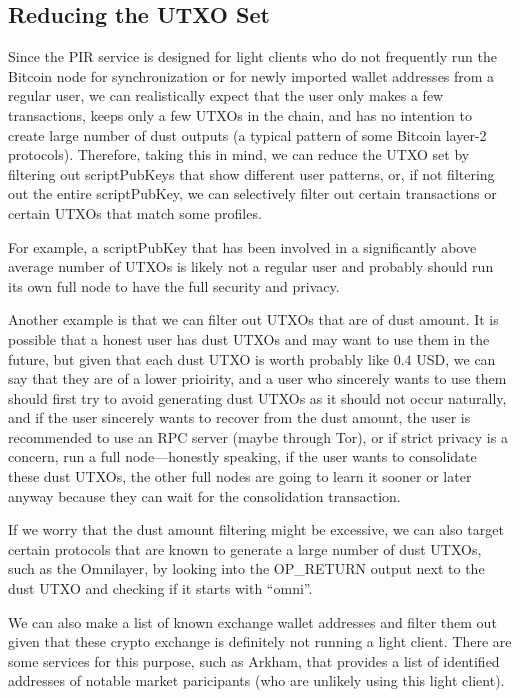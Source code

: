 \subsection{Reducing the UTXO Set}
\label{sec:extension}

Since the PIR service is designed for light clients who do not frequently run the Bitcoin node for synchronization or for newly imported wallet addresses from a regular user, we can realistically expect that the user only makes a few transactions, keeps only a few UTXOs in the chain, and has no intention to create large number of dust outputs (a typical pattern of some Bitcoin layer-2 protocols). Therefore, taking this in mind, we can reduce the UTXO set by filtering out scriptPubKeys that show different user patterns, or, if not filtering out the entire scriptPubKey, we can selectively filter out certain transactions or certain UTXOs that match some profiles.

For example, a scriptPubKey that has been involved in a significantly above average number of UTXOs is likely not a regular user and probably should run its own full node to have the full security and privacy.

Another example is that we can filter out UTXOs that are of dust amount. It is possible that a honest user has dust UTXOs and may want to use them in the future, but given that each dust UTXO is worth probably like $0.4$ USD, we can say that they are of a lower prioirity, and a user who sincerely wants to use them should first try to avoid generating dust UTXOs as it should not occur naturally, and if the user sincerely wants to recover from the dust amount, the user is recommended to use an RPC server (maybe through Tor), or if strict privacy is a concern, run a full node---honestly speaking, if the user wants to consolidate these dust UTXOs, the other full nodes are going to learn it sooner or later anyway because they can wait for the consolidation transaction.

If we worry that the dust amount filtering might be excessive, we can also target certain protocols that are known to generate a large number of dust UTXOs, such as the Omnilayer, by looking into the \textrm{OP\_RETURN} output next to the dust UTXO and checking if it starts with ``omni''.

We can also make a list of known exchange wallet addresses and filter them out given that these crypto exchange is definitely not running a light client. There are some services for this purpose, such as Arkham, that provides a list of identified addresses of notable market paricipants (who are unlikely using this light client).
